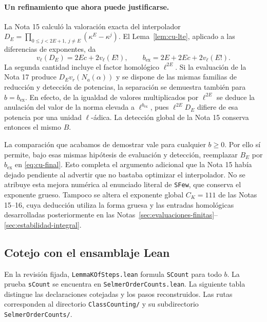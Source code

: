 \paragraph{Un refinamiento que ahora puede justificarse.}
La Nota 15 calculó la valoración exacta del interpolador
$D_E=\prod_{0\le j<2E+1,\ j\ne E}(\kappa^E-\kappa^j)$. El Lema~\ref{lem:cu-lte}, aplicado a las diferencias de exponentes, da
\begin{equation}
 v_\ell(D_E)=2Ec+2v_\ell(E!),\qquad
 b_{\mathrm{ex}}=2E+2Ec+2v_\ell(E!).
 \label{eq:cu-bexacto}
\end{equation}
La segunda cantidad incluye el factor homológico $\ell^{2E}$. Si la evaluación de la Nota 17 produce $D_E v_r(N_a(\alpha))$ y se dispone de las mismas familias de reducción y detección de potencias, la separación se demuestra también para $b=b_{\mathrm{ex}}$. En efecto, de la igualdad de valores multiplicados por $\ell^{2E}$ se deduce la anulación del valor de la norma elevada a $\ell^{b_{\mathrm{ex}}}$, pues $\ell^{2E}D_E$ difiere de esa potencia por una unidad $\ell$-ádica. La detección global de la Nota 15 conserva entonces el mismo $B$.

La comparación que acabamos de demostrar vale para cualquier $b\ge0$. Por ello sí permite, bajo esas mismas hipótesis de evaluación y detección, reemplazar $B_E$ por $b_{\mathrm{ex}}$ en \eqref{eq:cu-final}. Esto completa el argumento adicional que la Nota 15 había dejado pendiente al advertir que no bastaba optimizar el interpolador. No se atribuye esta mejora numérica al enunciado literal de \texttt{SFew}, que conserva el exponente grueso. Tampoco se altera el exponente global $C_K=111$ de las Notas 15--16, cuya deducción utiliza la forma gruesa y las entradas homológicas desarrolladas posteriormente en las Notas~\ref{sec:evaluaciones-finitas}--\ref{sec:estabilidad-integral}.

\subsection{Cotejo con el ensamblaje Lean}

En la revisión fijada, \texttt{LemmaKOfSteps.lean} formula \texttt{SCount} para todo $b$. La prueba \texttt{sCount} se encuentra en \texttt{SelmerOrderCounts.lean}. La siguiente tabla distingue las declaraciones cotejadas y los pasos reconstruidos. Las rutas corresponden al directorio \texttt{ClassCounting/} y su subdirectorio \texttt{SelmerOrderCounts/}.

